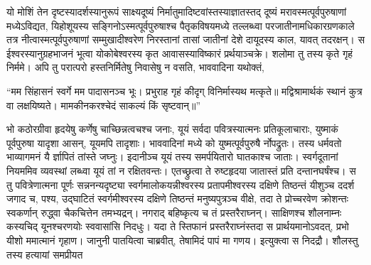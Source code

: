 \vakya यो मोशिं तेन दृष्टस्यादर्शस्यानुरूपं साक्ष्यदूष्यं निर्मातुमादिष्टवांस्तस्याज्ञातस्तद् दूष्यं मरावस्मत्पूर्वपुरुषाणां मध्येऽविद्यत,
\vakya यिहोशूयस्य सङ्गिनोऽस्मत्पूर्वपुरुषाश्च पैतृकविषयमध्ये तल्लब्ध्वा परजातीनामधिकारग्रणकाले तत्र नीत्वास्मत्पूर्वपुरुषाणां सम्मुखादीश्वरेण निरस्तानां तासां जातीनां देशे दायूदस्य काल, यावत् तदरक्षन्।
\vakya स ईश्वरस्यानुग्रहभाजनं भूत्वा योकोबेश्वरस्य कृत आवासस्याविष्कारं प्रर्थयाञ्चक्रे।
\vakya शलोमा तु तस्य कृते गृहं निर्ममे।
\vakya अपि तु परात्परो हस्तनिर्मितेषु निवासेषु न वसति, भाववादिना यथोक्तं,
\begin{poem}
\vakya “मम सिंहासनं स्वर्गे मम पादासनञ्च भूः।
\pline प्रभुराह गृहं कीदृग् विनिर्मास्यथ मत्कृते॥
\pline मद्विश्रामार्थकं स्थानं कुत्र वा लक्षयिष्यते।
\vakya मामकीनकरश्चेदं  साकल्यं किं सृष्टवान्॥”
\end{poem}
\vakya भो कठोरग्रीवा हृदयेषु कर्णेषु चाच्छिन्नत्वचश्च जनाः, यूयं सर्वदा पवित्रस्यात्मनः प्रतिकूलाचाराः, युष्माकं पूर्वपुरुषा यादृशा आसन्, यूयमपि तादृशाः।
\vakya भाववादिनां मध्ये को युष्मत्पूर्वपुरुषै र्नोपद्रुतः। तस्य धर्मवतो भाव्यागमनं यै र्ज्ञापितं तांस्ते जघ्नुः। इदानीञ्च यूयं तस्य समर्पयितारो घातकाश्च जाताः।
\vakya स्वर्गदूतानां नियममिव व्यवस्थां लब्ध्वा यूयं तां न रक्षितवन्तः।
\vakya एतच्छ्रुत्वा ते रुष्टहृदया जातास्तं प्रति दन्तानघर्षंश्च।
\vakya स तु पवित्रेणात्मना पूर्णः सन्ननन्यदृष्ट्या स्वर्गमालोकयन्नीश्वरस्य प्रतापमीश्वरस्य दक्षिणे तिष्ठन्तं यीशुञ्च ददर्श जगाद च,
\vakya पश्य, उद्घाटितं स्वर्गमीश्वरस्य दक्षिणे तिष्ठन्तं मनुष्यपुत्रञ्च वीक्षे,
\vakya तदा ते प्रोच्चरवेण क्रोशन्तः स्वकर्णान् रुद्ध्वा चैकचित्तेन तमभ्यद्रन्।
\vakya नगराद् बहिष्कृत्य च तं प्रस्तरैराघ्नन्। साक्षिणश्च शौलनाम्नः कस्यचिद् यूनश्चरणयोः स्ववासांसि निदधुः।
\vakya यदा ते स्तिफानं प्रस्तरैराघ्नंस्तदा स प्रार्थयमानोऽवदत्, प्रभो यीशो ममात्मानं गृहाण।
\vakya जानुनी पातयित्वा चाब्रवीत्, तेषामिदं पापं मा गणय। इत्युक्त्वा स निदद्रौ। शौलस्तु तस्य हत्यायां समप्रीयत\eoc